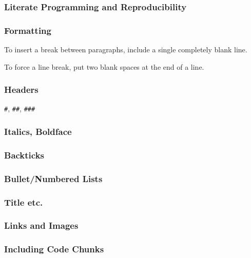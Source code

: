 \documentclass[11pt,]{article}
\begin{document}
\subsubsection{Literate Programming and
Reproducibility}\label{literate-programming-and-reproducibility}

\subsubsection{Formatting}\label{formatting}

To insert a break between paragraphs, include a single completely blank
line.

To force a line break, put two blank spaces at the end of a line.

\subsubsection{Headers}\label{headers}

\texttt{\#}, \texttt{\#\#}, \texttt{\#\#\#}

\subsubsection{Italics, Boldface}\label{italics-boldface}

\subsubsection{Backticks}\label{backticks}

\subsubsection{Bullet/Numbered Lists}\label{bulletnumbered-lists}

\subsubsection{Title etc.}\label{title-etc.}

\subsubsection{Links and Images}\label{links-and-images}

\subsubsection{Including Code Chunks}\label{including-code-chunks}
\end{document}
